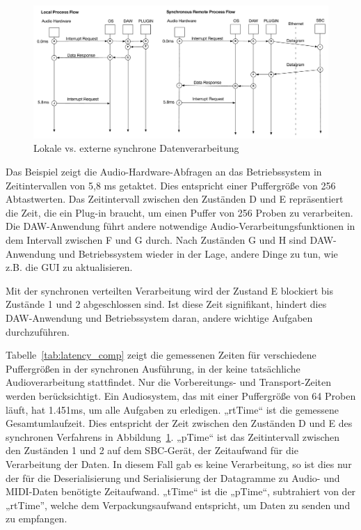 \begin{figure}[H]
    \centering
    \includegraphics[width=\textwidth]{assets/conclusion/process_flow_compared.pdf}
    \caption{Lokale vs. externe synchrone Datenverarbeitung}
    \label{fig:local_vs_remote}
\end{figure}

Das Beispiel zeigt die Audio-Hardware-Abfragen an das Betriebssystem in Zeitintervallen von 5,8 ms getaktet. Dies entspricht einer Puffergröße von 256 Abtastwerten. Das Zeitintervall zwischen den Zuständen D und E repräsentiert die Zeit, die ein Plug-in braucht, um einen Puffer von 256 Proben zu verarbeiten. Die DAW-Anwendung führt andere notwendige Audio-Verarbeitungsfunktionen in dem Intervall zwischen F und G durch. Nach Zuständen G und H sind DAW-Anwendung und Betriebssystem wieder in der Lage, andere Dinge zu tun, wie z.B. die GUI zu aktualisieren.

Mit der synchronen verteilten Verarbeitung wird der Zustand E blockiert bis Zustände 1 und 2 abgeschlossen sind. Ist diese Zeit signifikant, hindert dies DAW-Anwendung und Betriebssystem daran, andere wichtige Aufgaben durchzuführen.



Tabelle~\ref{tab:latency_comp} zeigt die gemessenen Zeiten für verschiedene Puffergrößen in der synchronen Ausführung, in der keine tatsächliche Audioverarbeitung stattfindet. Nur die Vorbereitungs- und Transport-Zeiten werden berücksichtigt. Ein Audiosystem, das  mit einer Puffergröße von 64 Proben läuft, hat 1.451ms, um alle Aufgaben zu erledigen. „rtTime“ ist die gemessene Gesamtumlaufzeit. Dies entspricht der Zeit zwischen den Zuständen D und E des synchronen Verfahrens in Abbildung~\ref{fig:local_vs_remote}. „pTime“ ist das Zeitintervall zwischen den Zuständen 1 und 2 auf dem SBC-Gerät, der Zeitaufwand für die Verarbeitung der Daten. In diesem Fall gab es keine Verarbeitung, so ist dies nur der für die Deserialisierung und Serialisierung der Datagramme zu Audio- und MIDI-Daten benötigte Zeitaufwand. „tTime“ ist die „pTime“, subtrahiert von der „rtTime”, welche dem Verpackungsaufwand entspricht, um Daten zu senden und zu empfangen.


